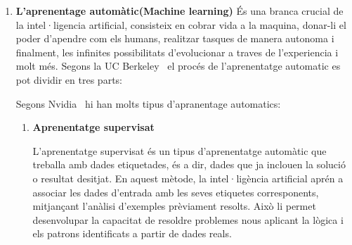 \begin{enumerate}
    \item \textbf{L'aprenentage automàtic(Machine learning)}\label{Aprenentatge_automàtic}
    És una branca crucial de la intel·ligencia artificial, consisteix en cobrar vida a la maquina, donar-li el poder d'apendre com els humans, realitzar tasques de manera autonoma i finalment, les infinites possibilitats d'evolucionar a traves de l'experiencia i molt més. Segons la UC Berkeley~\cite{Berkeley} el procés de l'aprenentatge automatic es pot dividir en tres parts:
       Segons Nvidia~\cite{Nvidia} hi han molts tipus d'apranentage automatics:
      \begin{enumerate}
       \item \hypertarget{Aprenentatge supervisat}{\textbf{Aprenentatge supervisat}}
       L'aprenentatge supervisat és un tipus d'aprenentatge automàtic que treballa amb dades etiquetades, és a dir, dades que ja inclouen la solució o resultat desitjat. En aquest mètode, la intel·ligència artificial aprén a associar les dades d'entrada amb les seves etiquetes corresponents, mitjançant l'anàlisi d'exemples prèviament resolts. Això li permet desenvolupar la capacitat de resoldre problemes nous aplicant la lògica i els patrons identificats a partir de dades reals. \\


\end{enumerate}
\end{enumerate}
